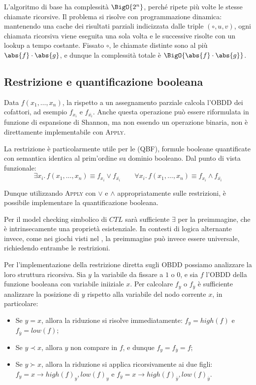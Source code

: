 L'algoritmo di base ha complessità \(\BigO{2^n}\), perché ripete più volte le stesse chiamate ricorsive. Il problema si risolve con programmazione dinamica: mantenendo una cache dei risultati parziali indicizzata dalle triple \((\circ,u,v)\), ogni chiamata ricorsiva viene eseguita una sola volta e le successive risolte con un lookup a tempo costante. Fissato \(\circ\), le chiamate distinte sono al più \(\abs{f}\cdot \abs{g}\), e dunque la complessità totale è \(\BigO{\abs{f}\cdot \abs{g}}\).

\subsection{Restrizione e quantificazione booleana}

Data \(f(x_1,\ldots,x_n)\), la  rispetto a un assegnamento parziale calcola l'OBDD dei cofattori, ad esempio \(f_{x_i}\) e \(f_{\overline{x_i}}\). Anche questa operazione può essere riformulata in funzione di espansione di Shannon, ma non essendo un operazione binaria, non è direttamente implementabile con \textsc{Apply}.

La restrizione è particolarmente utile per le  (QBF), formule booleane quantificate con semantica identica al prim'ordine su dominio booleano. Dal punto di vista funzionale:
\[\exists x_i.\, f(x_1, \ldots, x_n) \equiv f_{x_i} \lor f_{\overline{x_i}} \qquad \forall x_i.\, f(x_1, \ldots, x_n) \equiv f_{x_i} \land f_{\overline{x_i}}\]

Dunque utilizzando \textsc{Apply} con \(\lor\) e \(\land\) appropriatamente sulle restrizioni, è possibile implementare la quantificazione booleana.

Per il model checking simbolico di \(CTL\) sarà sufficiente \(\exists\) per la preimmagine, che è intrinsecamente una proprietà esistenziale. In contesti di logica alternante invece, come nei giochi visti nel , la preimmagine può invece essere universale, richiedendo entrambe le restrizioni.

Per l'implementazione della restrizione diretta sugli OBDD possiamo analizzare la loro struttura ricorsiva. Sia \(y\) la variabile da fissare a \(1\) o \(0\), e sia \(f\) l'OBDD della funzione booleana con variabile iniiziale \(x\). Per calcolare \(f_y\) o \(f_{\overline{y}}\) è sufficiente analizzare la posizione di \(y\) rispetto alla variabile del nodo corrente \(x\), in particolare:
\begin{itemize}
  \item Se \(y = x\), allora la riduzione si risolve immediatamente: \(f_y = high(f)\) e \(f_{\overline{y}} = low(f)\);
  \item Se \(y \prec x\), allora \(y\) non compare in \(f\), e dunque \(f_y = f_{\overline{y}} = f\);
  \item Se \(y \succ x\), allora la riduzione si applica ricorsivamente ai due figli: \(f_y = x\to high(f)_y ,low(f)_y\) e \(f_{\overline{y}} = x\to high(f)_{\overline{y}} ,low(f)_{\overline{y}}\).
\end{itemize}

